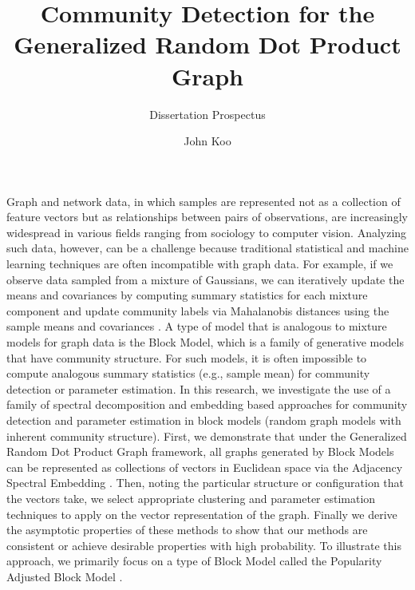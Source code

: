 \documentclass[
  11pt,
]{article}
\title{Community Detection for the\\
Generalized Random Dot Product Graph}
\subtitle{Dissertation Prospectus}
\author{John Koo}
\date{}
\begin{document}
\maketitle

\newcommand{\diag}{\text{diag}}
\newcommand{\tr}{\text{Tr}}
\newcommand{\blockdiag}{\text{blockdiag}}
\newcommand{\indep}{\stackrel{\text{ind}}{\sim}}
\newcommand{\iid}{\stackrel{\text{iid}}{\sim}}
\newcommand{\Bernoulli}{\text{Bernoulli}}
\newcommand{\Betadist}{\text{Beta}}
\newcommand{\BG}{\text{BernoulliGraph}}
\newcommand{\Cat}{\text{Categorical}}
\newcommand{\GRDPG}{\text{GRDPG}}
\newtheorem{definition}{Definition}
\newtheorem{theorem}{Theorem}
\newtheorem{lemma}{Lemma}
\theoremstyle{remark}
\newtheorem*{remark}{Remark}
\theoremstyle{example}
\newtheorem*{example}{Example}

Graph and network data, in which samples are represented not as a
collection of feature vectors but as relationships between pairs of
observations, are increasingly widespread in various fields ranging from
sociology to computer vision. Analyzing such data, however, can be a
challenge because traditional statistical and machine learning
techniques are often incompatible with graph data. For example, if we
observe data sampled from a mixture of Gaussians, we can iteratively
update the means and covariances by computing summary statistics for
each mixture component and update community labels via Mahalanobis
distances using the sample means and covariances
\cite{doi:10.1198/016214502760047131}. A type of model that is analogous
to mixture models for graph data is the Block Model, which is a family
of generative models that have community structure. For such models, it
is often impossible to compute analogous summary statistics (e.g.,
sample mean) for community detection or parameter estimation. In this
research, we investigate the use of a family of spectral decomposition
and embedding based approaches for community detection and parameter
estimation in block models (random graph models with inherent community
structure). First, we demonstrate that under the Generalized Random Dot
Product Graph \cite{rubindelanchy2017statistical} framework, all graphs
generated by Block Models can be represented as collections of vectors
in Euclidean space via the Adjacency Spectral Embedding
\cite{athreya2017statistical, lyzinski2014}. Then, noting the particular
structure or configuration that the vectors take, we select appropriate
clustering and parameter estimation techniques to apply on the vector
representation of the graph. Finally we derive the asymptotic properties
of these methods to show that our methods are consistent or achieve
desirable properties with high probability. To illustrate this approach,
we primarily focus on a type of Block Model called the Popularity
Adjusted Block Model \cite{307cbeb9b1be48299388437423d94bf1}.
\end{document}
